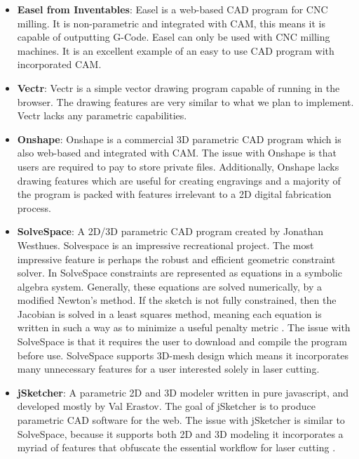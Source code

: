 \begin{itemize}
  \item \textbf{Easel from Inventables}: Easel is a web-based CAD program for CNC milling. It is non-parametric and integrated with CAM, this means it is capable of outputting G-Code. Easel can only be used with CNC milling machines. It is an excellent example of an easy to use CAD program with incorporated CAM.
  \item \textbf{Vectr}: Vectr is a simple vector drawing program capable of running in the browser. The drawing features are very similar to what we plan to implement. Vectr lacks any parametric capabilities.
  \item \textbf{Onshape}: Onshape is a commercial 3D parametric CAD program which is also web-based and integrated with CAM. The issue with Onshape is that users are required to pay to store private files. Additionally, Onshape lacks drawing features which are useful for creating engravings and a majority of the program is packed with features irrelevant to a 2D digital fabrication process.
  \item \textbf{SolveSpace}: A 2D/3D parametric CAD program created by Jonathan Westhues. Solvespace is an impressive recreational project. The most impressive feature is perhaps the robust and efficient geometric constraint solver. In SolveSpace constraints are represented as equations in a symbolic algebra system. Generally, these equations are solved numerically, by a modified Newton's method. If the sketch is not fully constrained, then the Jacobian is solved in a least squares method, meaning each equation is written in such a way as to minimize a useful penalty metric \cite{solvespace} \cite{solvespace2}. The issue with SolveSpace is that it requires the user to download and compile the program before use. SolveSpace supports 3D-mesh design which means it incorporates many unnecessary features for a user interested solely in laser cutting.
  \item \textbf{jSketcher}: A parametric 2D and 3D modeler written in pure javascript, and developed mostly by Val Erastov. The goal of jSketcher is to produce parametric CAD software for the web. The issue with jSketcher is similar to SolveSpace, because it supports both 2D and 3D modeling it incorporates a myriad of features that obfuscate the essential workflow for laser cutting \cite{jsketcher}.
\end{itemize}
